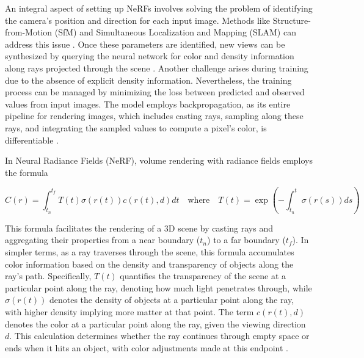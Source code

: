 An integral aspect of setting up NeRFs involves solving the problem of identifying the camera's position and direction for each input image. Methods like Structure-from-Motion (SfM) and Simultaneous Localization and Mapping (SLAM) can address this issue \citep{wei2021nerfingmvs}. Once these parameters are identified, new views can be synthesized by querying the neural network for color and density information along rays projected through the scene \citep{gerats2023dynamic}. Another challenge arises during training due to the absence of explicit density information. Nevertheless, the training process can be managed by minimizing the loss between predicted and observed values from input images. The model employs backpropagation, as its entire pipeline for rendering images, which includes casting rays, sampling along these rays, and integrating the sampled values to compute a pixel's color, is differentiable \citep{yariv2020multiview}.

In Neural Radiance Fields (NeRF), volume rendering with radiance fields employs the formula 

\[ 
C(r) = \int_{t_n}^{t_f} T(t)\sigma(r(t))c(r(t), d)dt \quad \text{where} \quad T(t) = \exp\left(-\int_{t_n}^t \sigma(r(s))ds\right) 
\]

This formula \citep{mildenhallNERF} facilitates the rendering of a 3D scene by casting rays and aggregating their properties from a near boundary (\(t_n\)) to a far boundary (\(t_f\)). In simpler terms, as a ray traverses through the scene, this formula accumulates color information based on the density and transparency of objects along the ray's path. Specifically, \( T(t) \) quantifies the transparency of the scene at a particular point along the ray, denoting how much light penetrates through, while \( \sigma(r(t)) \) denotes the density of objects at a particular point along the ray, with higher density implying more matter at that point. The term \( c(r(t), d) \) denotes the color at a particular point along the ray, given the viewing direction \( d \). This calculation determines whether the ray continues through empty space or ends when it hits an object, with color adjustments made at this endpoint \citep{mildenhallNERF}.


